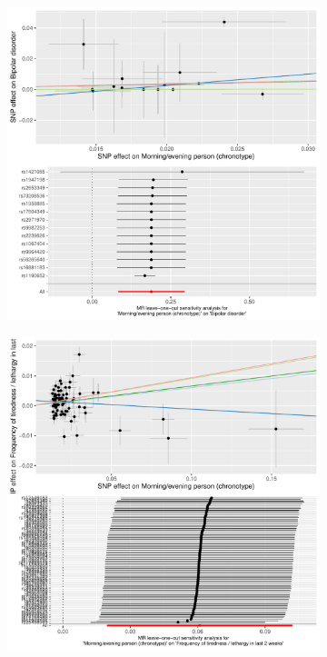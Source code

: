 \documentclass{article}
\begin{document}
\begin{figure}[htbp]
     \centering
     \begin{subfigure}[b]{0.4\textwidth}
         \centering
         \includegraphics[width=\textwidth]{Figs/Analysis2/Morning_evening_person_(chronotype)_vs_Bipolar_disorder.Plots.pdf}
         \caption{}
         \label{t2dm}
     \end{subfigure}
     \begin{subfigure}[b]{0.4\textwidth}
         \centering
         \includegraphics[width=\textwidth]{Figs/Analysis2/Morning_evening_person_(chronotype)_vs_Frequency_of_tiredness___lethargy_in_last_2_weeks.Plots.pdf}

\end{subfigure}
\end{figure}
\end{document}
